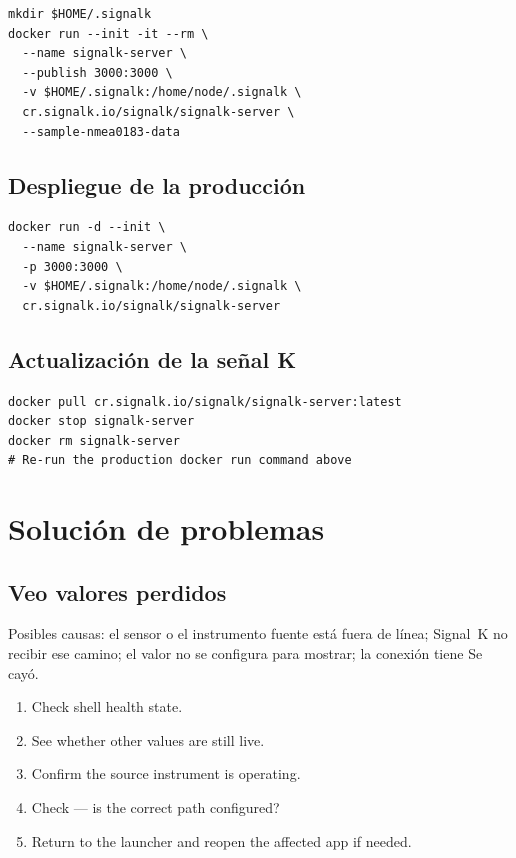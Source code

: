 \begin{lstlisting}
mkdir $HOME/.signalk
docker run --init -it --rm \
  --name signalk-server \
  --publish 3000:3000 \
  -v $HOME/.signalk:/home/node/.signalk \
  cr.signalk.io/signalk/signalk-server \
  --sample-nmea0183-data
\end{lstlisting}

\section{Despliegue de la producción}

\begin{lstlisting}
docker run -d --init \
  --name signalk-server \
  -p 3000:3000 \
  -v $HOME/.signalk:/home/node/.signalk \
  cr.signalk.io/signalk/signalk-server
\end{lstlisting}

\section{Actualización de la señal K}

\begin{lstlisting}
docker pull cr.signalk.io/signalk/signalk-server:latest
docker stop signalk-server
docker rm signalk-server
# Re-run the production docker run command above
\end{lstlisting}

\chapter{Solución de problemas}
\label{ch:troubleshooting}

\section{Veo valores perdidos}

Posibles causas: el sensor o el instrumento fuente está fuera de línea; Signal~K no
recibir ese camino; el valor no se configura para mostrar; la conexión tiene
Se cayó.

\begin{enumerate}
  \item Check shell health state.
  \item See whether other values are still live.
  \item Confirm the source instrument is operating.
  \item Check  --- is the correct path configured?
  \item Return to the launcher and reopen the affected app if needed.
\end{enumerate}


